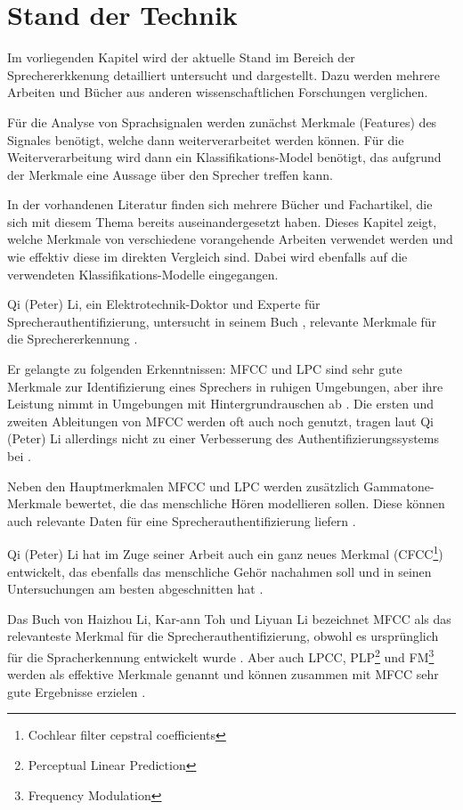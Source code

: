 \section{Stand der Technik} \label{stand_der_technik}
Im vorliegenden Kapitel wird der aktuelle Stand im Bereich der Sprechererkkenung detailliert untersucht und dargestellt.
Dazu werden mehrere Arbeiten und Bücher aus anderen wissenschaftlichen Forschungen verglichen.

Für die Analyse von Sprachsignalen werden zunächst Merkmale (Features) des Signales benötigt, welche dann weiterverarbeitet werden können.
Für die Weiterverarbeitung wird dann ein Klassifikations-Model benötigt, das aufgrund der Merkmale eine Aussage über den Sprecher treffen kann.

In der vorhandenen Literatur finden sich mehrere Bücher und Fachartikel, die sich mit diesem Thema bereits auseinandergesetzt haben. 
Dieses Kapitel zeigt, welche Merkmale von verschiedene vorangehende Arbeiten verwendet werden und wie effektiv diese im direkten Vergleich sind. Dabei wird ebenfalls auf die verwendeten Klassifikations-Modelle eingegangen.

Qi (Peter) Li, ein Elektrotechnik-Doktor und Experte für Sprecherauthentifizierung, untersucht in seinem Buch , relevante Merkmale für die Sprechererkennung \autocite{li_speaker_2012}.

Er gelangte zu folgenden Erkenntnissen:
\ac{MFCC} und \ac{LPC} sind sehr gute Merkmale zur Identifizierung eines Sprechers in ruhigen Umgebungen, aber ihre Leistung nimmt in Umgebungen mit Hintergrundrauschen ab \autocite[vgl.][S. 136]{li_speaker_2012}.
Die ersten und zweiten Ableitungen von \ac{MFCC} werden oft auch noch genutzt, tragen laut Qi (Peter) Li allerdings nicht zu einer Verbesserung des Authentifizierungssystems bei \autocite[vgl.][S. 143]{li_speaker_2012}.

Neben den Hauptmerkmalen \ac{MFCC} und \ac{LPC} werden zusätzlich Gammatone-Merkmale bewertet, die das menschliche Hören modellieren sollen.
Diese können auch relevante Daten für eine Sprecherauthentifizierung liefern \autocite[vgl.][S. 111, 117]{li_speaker_2012}.

Qi (Peter) Li hat im Zuge seiner Arbeit auch ein ganz neues Merkmal (CFCC\footnote{Cochlear filter cepstral coefficients}) entwickelt, das ebenfalls das menschliche Gehör nachahmen soll und in seinen Untersuchungen am besten abgeschnitten hat \autocite[vgl.][S. 135]{li_speaker_2012}.

Das Buch  von Haizhou Li, Kar-ann Toh und Liyuan Li bezeichnet \ac{MFCC} als das relevanteste Merkmal für die Sprecherauthentifizierung, obwohl es ursprünglich für die Spracherkennung entwickelt wurde \autocite[vgl.][S. 7, 51]{li_advanced_2011}.
Aber auch \ac{LPCC}, PLP\footnote{Perceptual Linear Prediction} und FM\footnote{Frequency Modulation} werden als effektive Merkmale genannt und können zusammen mit \ac{MFCC} sehr gute Ergebnisse erzielen \autocite[vgl.][S. 6, 67]{li_advanced_2011}.

